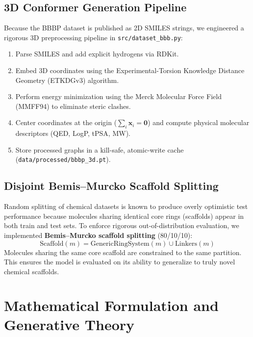\documentclass[12pt, a4paper]{article}
\begin{document}
\subsection{3D Conformer Generation Pipeline}
Because the BBBP dataset is published as 2D SMILES strings, we engineered a rigorous 3D preprocessing pipeline in \texttt{src/dataset\_bbb.py}:
\begin{enumerate}[noitemsep]
    \item Parse SMILES and add explicit hydrogens via RDKit.
    \item Embed 3D coordinates using the Experimental-Torsion Knowledge Distance Geometry (ETKDGv3) algorithm.
    \item Perform energy minimization using the Merck Molecular Force Field (MMFF94) to eliminate steric clashes.
    \item Center coordinates at the origin ($\sum_i \mathbf{x}_i = \mathbf{0}$) and compute physical molecular descriptors (QED, LogP, tPSA, MW).
    \item Store processed graphs in a kill-safe, atomic-write cache (\texttt{data/processed/bbbp\_3d.pt}).
\end{enumerate}

\subsection{Disjoint Bemis--Murcko Scaffold Splitting}
Random splitting of chemical datasets is known to produce overly optimistic test performance because molecules sharing identical core rings (scaffolds) appear in both train and test sets. To enforce rigorous out-of-distribution evaluation, we implemented \textbf{Bemis--Murcko scaffold splitting} (80/10/10):
\begin{equation}
    \text{Scaffold}(m) = \text{GenericRingSystem}(m) \cup \text{Linkers}(m)
\end{equation}
Molecules sharing the same core scaffold are constrained to the same partition. This ensures the model is evaluated on its ability to generalize to truly novel chemical scaffolds.

\section{Mathematical Formulation and Generative Theory}
\end{document}
